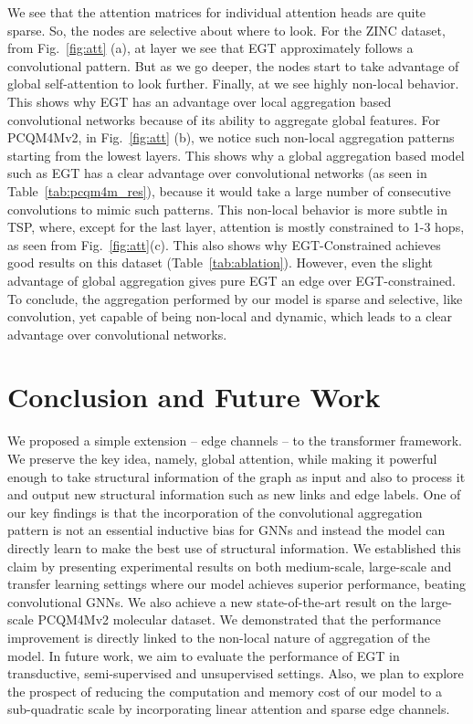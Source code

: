 \documentclass[sigconf,authorversion]{acmart}
\begin{document}
We see that the attention matrices for individual attention heads are quite sparse. So, the nodes are selective about where to look. For the ZINC dataset, from Fig.~\ref{fig:att} (a), at layer  we see that EGT approximately follows a convolutional pattern. But as we go deeper, the nodes start to take advantage of global self-attention to look further. Finally, at  we see highly non-local behavior. This shows why EGT has an advantage over local aggregation based convolutional networks because of its ability to aggregate global features. For PCQM4Mv2, in Fig.~\ref{fig:att} (b), we notice such non-local aggregation patterns starting from the lowest layers. This shows why a global aggregation based model such as EGT has a clear advantage over convolutional networks (as seen in Table~\ref{tab:pcqm4m_res}), because it would take a large number of consecutive convolutions to mimic such patterns. This non-local behavior is more subtle in TSP, where, except for the last layer, attention is mostly constrained to 1-3 hops, as seen from Fig.~\ref{fig:att}(c). This also shows why  EGT-Constrained achieves good results on this dataset (Table~\ref{tab:ablation}). However, even the slight advantage of global aggregation gives pure EGT an edge over EGT-constrained. To conclude, the aggregation performed by our model is sparse and selective, like convolution, yet capable of being non-local and dynamic, which leads to a clear advantage over convolutional networks.


\section{Conclusion and Future Work}
We proposed a simple extension -- edge channels -- to the transformer framework. We preserve the key idea, namely, global attention, while making it powerful enough to take structural information of the graph as input and also to process it and output new structural information such as new links and edge labels. One of our key findings is that the incorporation of the convolutional aggregation pattern is not an essential inductive bias for GNNs and instead the model can directly learn to make the best use of structural information. We established this claim by presenting experimental results on both medium-scale, large-scale and transfer learning settings where our model achieves superior performance, beating convolutional GNNs. We also achieve a new state-of-the-art result on the large-scale PCQM4Mv2 molecular dataset. We demonstrated that the performance improvement is directly linked to the non-local nature of aggregation of the model. In future work, we aim to evaluate the performance of EGT in transductive, semi-supervised and unsupervised settings. Also, we plan to explore the prospect of reducing the computation and memory cost of our model to a sub-quadratic scale by incorporating linear attention \citep{choromanski2020rethinking,katharopoulos2020transformers,schlag2021linear} and sparse edge channels.
\end{document}
